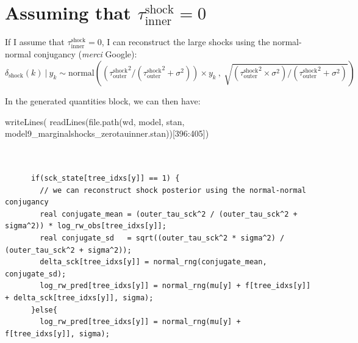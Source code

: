\documentclass[
  letterpaper,
  DIV=11,
  numbers=noendperiod]{scrartcl}
\newenvironment{Shaded}{\begin{snugshade}}{\end{snugshade}}
\newcommand{\DecValTok}[1]{\textcolor[rgb]{0.68,0.00,0.00}{#1}}
\newcommand{\FunctionTok}[1]{\textcolor[rgb]{0.28,0.35,0.67}{#1}}
\newcommand{\NormalTok}[1]{\textcolor[rgb]{0.00,0.23,0.31}{#1}}
\newcommand{\SpecialCharTok}[1]{\textcolor[rgb]{0.37,0.37,0.37}{#1}}
\newcommand{\StringTok}[1]{\textcolor[rgb]{0.13,0.47,0.30}{#1}}
\begin{document}
\linespread{2}

\section{\texorpdfstring{Assuming that
{\({\tau_\text{inner}^\text{shock}} = 0\)}}{Assuming that \{\textbackslash tau\_\textbackslash text\{inner\}\^{}\textbackslash text\{shock\}\} = 0}}\label{assuming-that-tau_textinnertextshock-0}

If I assume that \({\tau_\text{inner}^\text{shock}} = 0\), I can
reconstruct the large shocks using the normal-normal conjugancy
(\emph{merci} Google):
\[\delta_\text{shock}(k) ~|~ y_k \sim \text{normal} \left( ({\tau_\text{outer}^\text{shock}}^2 / ({\tau_\text{outer}^\text{shock}}^2 + \sigma^2)) \times y_k ~,~ \sqrt{({\tau_\text{outer}^\text{shock}}^2 \times \sigma^2) / ({\tau_\text{outer}^\text{shock}}^2 + \sigma^2)}\right)\]

In the generated quantities block, we can then have:

\linespread{0.5}

\begin{Shaded}
\begin{Highlighting}[]
\FunctionTok{writeLines}\NormalTok{(}
  \FunctionTok{readLines}\NormalTok{(}\FunctionTok{file.path}\NormalTok{(wd, }\StringTok{\textquotesingle{}model\textquotesingle{}}\NormalTok{, }\StringTok{\textquotesingle{}stan\textquotesingle{}}\NormalTok{, }
                      \StringTok{\textquotesingle{}model9\_marginalshocks\_zerotauinner.stan\textquotesingle{}}\NormalTok{))[}\DecValTok{396}\SpecialCharTok{:}\DecValTok{405}\NormalTok{])}
\end{Highlighting}
\end{Shaded}

\begin{verbatim}

      
      if(sck_state[tree_idxs[y]] == 1) {
        // we can reconstruct shock posterior using the normal-normal conjugancy 
        real conjugate_mean = (outer_tau_sck^2 / (outer_tau_sck^2 + sigma^2)) * log_rw_obs[tree_idxs[y]];
        real conjugate_sd   = sqrt((outer_tau_sck^2 * sigma^2) / (outer_tau_sck^2 + sigma^2));
        delta_sck[tree_idxs[y]] = normal_rng(conjugate_mean, conjugate_sd);
        log_rw_pred[tree_idxs[y]] = normal_rng(mu[y] + f[tree_idxs[y]] + delta_sck[tree_idxs[y]], sigma);
      }else{
        log_rw_pred[tree_idxs[y]] = normal_rng(mu[y] + f[tree_idxs[y]], sigma);
\end{verbatim}
\end{document}
